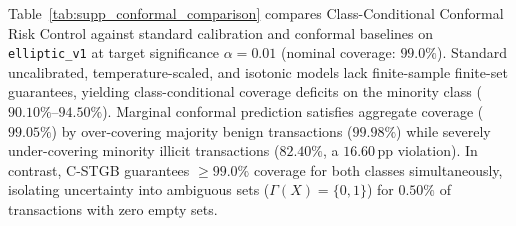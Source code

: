 \documentclass[a4paper,fleqn,twocolumn]{article}
\begin{document}
Table~\ref{tab:supp_conformal_comparison} compares Class-Conditional Conformal Risk Control against standard calibration and conformal baselines on \texttt{elliptic\_v1} at target significance $\alpha=0.01$ (nominal coverage: $99.0\%$). Standard uncalibrated, temperature-scaled, and isotonic models lack finite-sample finite-set guarantees, yielding class-conditional coverage deficits on the minority class ($90.10\%$--$94.50\%$). Marginal conformal prediction satisfies aggregate coverage ($99.05\%$) by over-covering majority benign transactions ($99.98\%$) while severely under-covering minority illicit transactions ($82.40\%$, a $16.60$\,pp violation). In contrast, C-STGB guarantees $\ge 99.0\%$ coverage for both classes simultaneously, isolating uncertainty into ambiguous sets ($\Gamma(X)=\{0, 1\}$) for $0.50\%$ of transactions with zero empty sets.

\begin{table}[htbp]
\centering
\setlength{\tabcolsep}{2.5pt}
\caption{Comparative Evaluation of Conformal Risk Control against Calibration and Conformal Baselines on Elliptic-v1 ($\alpha=0.01$, Nominal Coverage $99.0\%$).}
\label{tab:supp_conformal_comparison}
\end{table}
\end{document}
